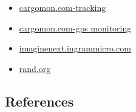 \documentclass[
]{book}
\providecommand{\tightlist}{%
  \setlength{\itemsep}{0pt}\setlength{\parskip}{0pt}}
\begin{document}
\begin{itemize}
\tightlist
\item
  \href{http://cargomon.com/index.php/language/en/cargoobserver-track/}{cargomon.com-tracking}
\item
  \href{http://cargomon.com/index.php/language/en/industry-sectors-for-montoring-gps/}{cargomon.com-gps monitoring}
\item
  \href{https://imaginenext.ingrammicro.com/iot/rfid-in-logistics}{imaginenext.ingrammicro.com}
\item
  \href{https://www.rand.org/pubs/technical_reports/TR1283.html}{rand.org}
\end{itemize}

\hypertarget{references-28}{%
\subsection*{References}\label{references-28}}
\end{document}
